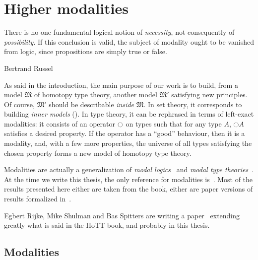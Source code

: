 \chapter{Higher modalities}
\label{chap:modalities}

\epigraph{There is no one fundamental logical notion of {\em
    necessity}, not consequently of {\em possibility}. If this
  conclusion is valid, the subject of modality ought to be vanished
  from logic, since propositions are simply true or false.}{Bertrand Russel}

As said in the introduction, the main purpose of our work is to build,
from a model $\mathfrak M$ of homotopy type theory, another model
$\mathfrak M'$ satisfying new principles. Of course, $\mathfrak M'$
should be describable {\em inside} $\mathfrak M$. In set theory, it
corresponds to building {\em inner models} (\cite{kunen}).%
%
In type theory, it can be rephrased in terms of left-exact modalities:
it consists of an operator $\ocircle$ on types such that for any type
$A$, $\ocircle A$ satisfies a desired property. If the operator has a
``good'' behaviour, then it is a modality, and, with a few more
properties, the universe of all types satisfying the chosen property
forms a new model of homotopy type theory.

Modalities are actually a generalization of {\em modal logics}~\cite{goldblatt-modal} and
{\em modal type theories}~\cite{moggi-monad}. At the time we write this
thesis, the only reference for modalities is~\cite[Section
7.7]{hottbook}. 
Most of the results presented here either are taken from the book,
either are paper versions of results formalized in~\cite[{Folder
  }]{hottlib}.

Egbert Rijke, Mike Shulman and Bas Spitters
are writing a paper~\cite{RijkeShulmanSpitters} extending greatly what is said in the HoTT book,
and probably in this thesis.


\section{Modalities}
\label{sec:modalities}


